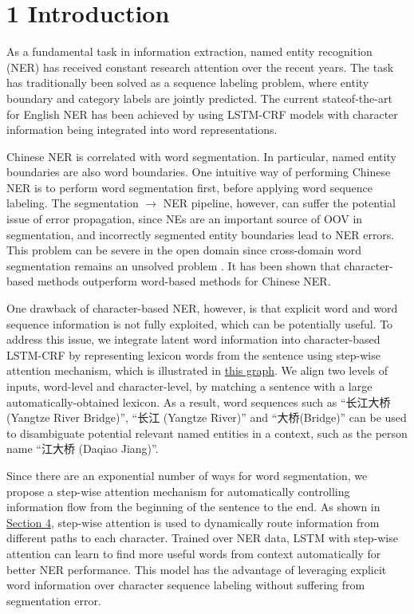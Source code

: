 \documentclass[letterpaper]{article} %
\begin{document}
\section{1  Introduction}

As a fundamental task in information extraction,
named entity recognition (NER) has received constant research attention over the recent years. The task has traditionally been solved as a sequence labeling problem, where entity boundary and category labels are jointly predicted. The current stateof-the-art for English NER has been achieved by using LSTM-CRF models\cite{lample,ma,chiu,liu} with character information being integrated into word representations.

Chinese NER is correlated with word segmentation. In particular, named entity boundaries are
also word boundaries. One intuitive way of performing Chinese NER is to perform word segmentation first, before applying word sequence labeling. The segmentation 
$\rightarrow$ NER pipeline, however, can suffer the potential issue of error propagation, since NEs are an important source of OOV in segmentation, and incorrectly segmented entity boundaries lead to NER errors. This problem can be severe in the open domain since cross-domain word segmentation remains an unsolved
problem \cite{liu,jiang,huang}. It has been shown that character-based methods outperform word-based methods for Chinese NER.

One drawback of character-based NER, however, is that explicit word and word sequence information is not fully exploited, which can be potentially useful. To address this issue, we integrate latent word information into character-based LSTM-CRF by representing lexicon words from the sentence using step-wise attention mechanism, which is illustrated in \hyperref[sec:our]{this graph}. We align two levels of inputs, word-level and character-level, by matching a sentence with a large automatically-obtained lexicon. As a result, word sequences such as  “长江大桥(Yangtze River Bridge)”, “长江 (Yangtze River)” and “大桥(Bridge)” can be used to disambiguate potential relevant named entities in a context, such as the person name “江大桥 (Daqiao Jiang)”.

Since there are an exponential number of ways for word segmentation, we propose a step-wise attention mechanism for automatically controlling information flow from the beginning of the sentence to the end. As shown in \hyperref[sec:disc]{Section 4}, step-wise attention is used to dynamically route information from different paths to each character. Trained over NER data, LSTM with step-wise attention can learn to find more useful words from context automatically for better NER performance. This model has the advantage of leveraging explicit word information over character sequence labeling without suffering from segmentation error.
\end{document}
